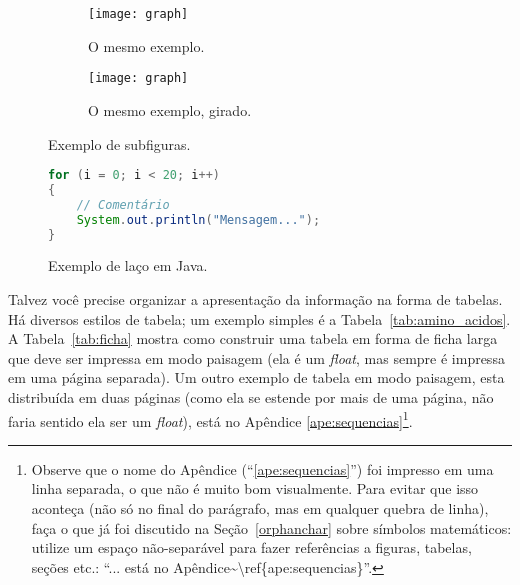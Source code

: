 \begin{figure}
  \centering
  \begin{subfigure}{0.4\textwidth}
    \texttt{[image: graph]}
    \caption{O mesmo exemplo.}
    \label{fig:subfigures:a}
  \end{subfigure}
  \begin{subfigure}{0.4\textwidth}
    \begin{turn}{90}
      \texttt{[image: graph]}
    \end{turn}
    \caption{O mesmo exemplo, girado.}
    \label{fig:subfigures:b}
  \end{subfigure}
  \caption{Exemplo de subfiguras.}
  \label{fig:subfigures}
\end{figure}


\begin{figure}
  \centering
\begin{lstlisting}[language=Java, style=wider]
for (i = 0; i < 20; i++)
{
	// Comentário
	System.out.println("Mensagem...");
}
\end{lstlisting}
  \caption{Exemplo de laço em Java.}
  \label{fig:java}
\end{figure}

Talvez você precise organizar a apresentação da informação na forma de
tabelas. Há diversos estilos de tabela; um exemplo simples é a
Tabela~\ref{tab:amino_acidos}. A Tabela~\ref{tab:ficha} mostra como construir
uma tabela em forma de ficha larga que deve ser impressa em modo paisagem (ela
é um \textit{float}, mas sempre é impressa em uma página separada). Um outro
exemplo de tabela em modo paisagem, esta distribuída em duas páginas (como
ela se estende por mais de uma página, não faria sentido ela ser um
\textit{float}), está no Apêndice \ref{ape:sequencias}\footnote{
Observe que o nome do Apêndice (``\ref{ape:sequencias}'') foi impresso em uma
linha separada, o que não é muito bom visualmente. Para evitar que isso
aconteça (não só no final do parágrafo, mas em qualquer quebra de linha),
faça o que já foi discutido na Seção~\ref{orphanchar} sobre símbolos
matemáticos: utilize um espaço não-separável para fazer referências a
figuras, tabelas, seções etc.: ``\textsf{... está no
Apêndice\textasciitilde\textbackslash{}ref\{ape:sequencias\}}''.}.

